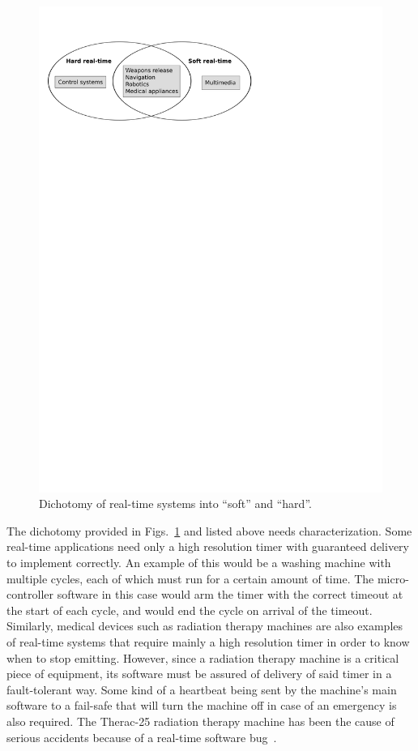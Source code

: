 \begin{figure}
\centering
\includegraphics[scale=0.75]{figs/rt_apps_overview}
\caption{Dichotomy of real-time systems into ``soft'' and
  ``hard''.}
\label{fig:rt_apps_overview}
\end{figure}

The dichotomy provided in Figs.~\ref{fig:rt_apps_overview} and listed
above needs characterization. Some real-time applications need only a
high resolution timer with guaranteed delivery to implement
correctly. An example of this would be a washing machine with multiple
cycles, each of which must run for a certain amount of time. The
micro-controller software in this case would arm the timer with the
correct timeout at the start of each cycle, and would end the cycle on
arrival of the timeout. Similarly, medical devices such as radiation
therapy machines are also examples of real-time systems that require
mainly a high resolution timer in order to know when to stop
emitting. However, since a radiation therapy machine is a critical
piece of equipment, its software must be assured of delivery of said
timer in a fault-tolerant way. Some kind of a heartbeat being sent by
the machine's main software to a fail-safe that will turn the machine
off in case of an emergency is also required. The Therac-25 radiation
therapy machine has been the cause of serious accidents because of a
real-time software bug~\cite{leveson@computer93}.

